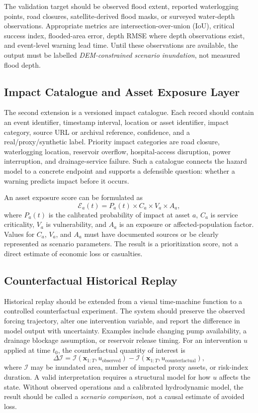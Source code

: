 \documentclass[journal]{IEEEtran}
\begin{document}
The validation target should be observed flood extent, reported waterlogging points, road closures, satellite-derived flood masks, or surveyed water-depth observations. Appropriate metrics are intersection-over-union (IoU), critical success index, flooded-area error, depth RMSE where depth observations exist, and event-level warning lead time. Until these observations are available, the output must be labelled \emph{DEM-constrained scenario inundation}, not measured flood depth.

\subsection{Impact Catalogue and Asset Exposure Layer}
The second extension is a versioned impact catalogue. Each record should contain an event identifier, timestamp interval, location or asset identifier, impact category, source URL or archival reference, confidence, and a real/proxy/synthetic label. Priority impact categories are road closure, waterlogging location, reservoir overflow, hospital-access disruption, power interruption, and drainage-service failure. Such a catalogue connects the hazard model to a concrete endpoint and supports a defensible question: whether a warning predicts impact before it occurs.

An asset exposure score can be formulated as
\begin{equation}
\mathcal{E}_a(t)=P_a(t)\times C_a\times V_a\times A_a,
\label{eq:exposure}
\end{equation}
where $P_a(t)$ is the calibrated probability of impact at asset $a$, $C_a$ is service criticality, $V_a$ is vulnerability, and $A_a$ is an exposure or affected-population factor. Values for $C_a$, $V_a$, and $A_a$ must have documented sources or be clearly represented as scenario parameters. The result is a prioritization score, not a direct estimate of economic loss or casualties.

\subsection{Counterfactual Historical Replay}
Historical replay should be extended from a visual time-machine function to a controlled counterfactual experiment. The system should preserve the observed forcing trajectory, alter one intervention variable, and report the difference in model output with uncertainty. Examples include changing pump availability, a drainage blockage assumption, or reservoir release timing. For an intervention $u$ applied at time $t_0$, the counterfactual quantity of interest is
\begin{equation}
\Delta \mathcal{I}=\mathcal{I}(\mathbf{x}_{1:T},u_{\mathrm{observed}})-\mathcal{I}(\mathbf{x}_{1:T},u_{\mathrm{counterfactual}}),
\label{eq:counterfactual}
\end{equation}
where $\mathcal{I}$ may be inundated area, number of impacted proxy assets, or risk-index duration. A valid interpretation requires a structural model for how $u$ affects the state. Without observed operations and a calibrated hydrodynamic model, the result should be called a \emph{scenario comparison}, not a causal estimate of avoided loss.
\end{document}
